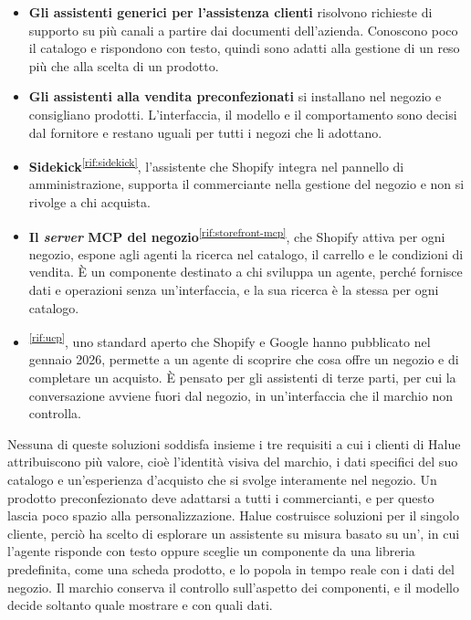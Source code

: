 \begin{itemize}
	\item \textbf{Gli assistenti generici per l’assistenza clienti} risolvono richieste di supporto
	su più canali a partire dai documenti dell’azienda. Conoscono poco il catalogo e rispondono con
	testo, quindi sono adatti alla gestione di un reso più che alla scelta di un prodotto.
	\item \textbf{Gli assistenti alla vendita preconfezionati} si installano nel negozio e
	consigliano prodotti. L’interfaccia, il modello e il comportamento sono decisi dal fornitore e
	restano uguali per tutti i negozi che li adottano.
	\item \textbf{Sidekick}\textsuperscript{\ref{rif:sidekick}}, l’assistente che Shopify integra nel
	pannello di amministrazione, supporta il commerciante nella gestione del negozio e non si
	rivolge a chi acquista.
	\item \textbf{Il \emph{server} MCP del negozio}\textsuperscript{\ref{rif:storefront-mcp}}, che
	Shopify attiva per ogni negozio, espone agli agenti la ricerca nel catalogo, il carrello e le
	condizioni di vendita. È un componente destinato a chi sviluppa un agente, perché fornisce dati
	e operazioni senza un’interfaccia, e la sua ricerca è la stessa per ogni catalogo.
	\item \textbf{}\textsuperscript{\ref{rif:ucp}}, uno standard aperto che Shopify
	e Google hanno pubblicato nel gennaio 2026, permette a un agente di scoprire che cosa offre un
	negozio e di completare un acquisto. È pensato per gli assistenti di terze parti, per cui la
	conversazione avviene fuori dal negozio, in un’interfaccia che il marchio non controlla.
\end{itemize}

Nessuna di queste soluzioni soddisfa insieme i tre requisiti a cui i clienti di Halue attribuiscono
più valore, cioè l’identità visiva del marchio, i dati specifici del suo catalogo e un’esperienza
d’acquisto che si svolge interamente nel negozio. Un prodotto preconfezionato deve adattarsi a
tutti i commercianti, e per questo lascia poco spazio alla personalizzazione. Halue costruisce
soluzioni per il singolo cliente, perciò ha scelto di esplorare un assistente su misura basato su
un’, in cui l’agente risponde con testo
oppure sceglie un componente da una libreria predefinita, come una scheda prodotto, e lo popola in
tempo reale con i dati del negozio. Il marchio conserva il controllo sull’aspetto dei componenti,
e il modello decide soltanto quale mostrare e con quali dati.
